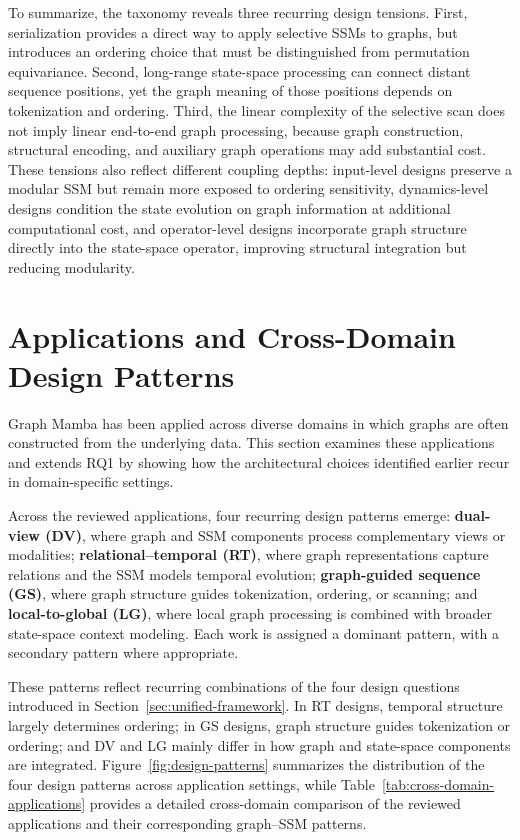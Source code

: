 \documentclass[acmsmall]{acmart}
\begin{document}
To summarize, the taxonomy reveals three recurring design tensions. First, serialization provides a direct way to apply selective SSMs to graphs, but introduces an ordering choice that must be distinguished from permutation equivariance. Second, long-range state-space processing can connect distant sequence positions, yet the graph meaning of those positions depends on tokenization and ordering. Third, the linear complexity of the selective scan does not imply linear end-to-end graph processing, because graph construction, structural encoding, and auxiliary graph operations may add substantial cost. These tensions also reflect different coupling depths: input-level designs preserve a modular SSM but remain more exposed to ordering sensitivity, dynamics-level designs condition the state evolution on graph information at additional computational cost, and operator-level designs incorporate graph structure directly into the state-space operator, improving structural integration but reducing modularity. %

 

 
\section{Applications and Cross-Domain Design Patterns}
\label{sec:applications}
Graph Mamba has been applied across diverse domains in which graphs are often
constructed from the underlying data. This section examines these applications
and extends RQ1 by showing how the architectural choices identified earlier
recur in domain-specific settings.

Across the reviewed applications, four recurring design patterns emerge:
\textbf{dual-view (DV)}, where graph and SSM components process complementary
views or modalities; \textbf{relational--temporal (RT)}, where graph
representations capture relations and the SSM models temporal evolution;
\textbf{graph-guided sequence (GS)}, where graph structure guides tokenization,
ordering, or scanning; and \textbf{local-to-global (LG)}, where local graph
processing is combined with broader state-space context modeling. Each work is
assigned a dominant pattern, with a secondary pattern where appropriate.

These patterns reflect recurring combinations of the four design
questions introduced in Section~\ref{sec:unified-framework}. In RT designs,
temporal structure largely determines ordering; in GS designs, graph structure
guides tokenization or ordering; and DV and LG mainly differ in how graph and
state-space components are integrated. Figure~\ref{fig:design-patterns} summarizes the distribution of the four design patterns across application settings, while Table~\ref{tab:cross-domain-applications} provides a detailed cross-domain comparison of the reviewed applications and their corresponding graph--SSM patterns.
\end{document}
